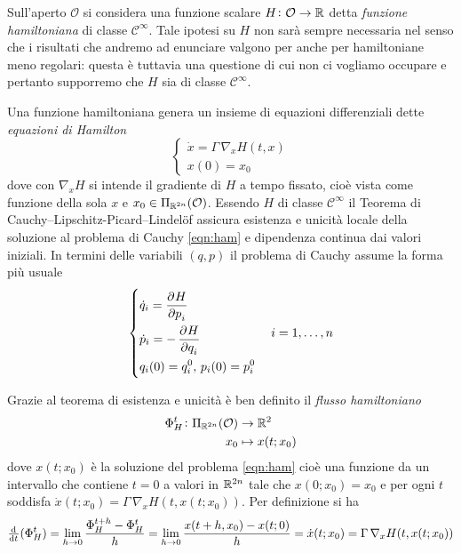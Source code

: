 Sull'aperto $ \mathcal{O} $ si considera una funzione scalare $ H \colon \mathcal{O} \to \mathbb{R} $ detta \emph{funzione hamiltoniana} di classe $ \mathcal{C}^{\infty} $. Tale ipotesi su $ H $ non sarà sempre necessaria nel senso che i risultati che andremo ad enunciare valgono per anche per hamiltoniane meno regolari: questa è tuttavia una questione di cui non ci vogliamo occupare e pertanto supporremo che $ H $ sia di classe $ \mathcal{C}^\infty $.

Una funzione hamiltoniana genera un insieme di equazioni differenziali dette \emph{equazioni di Hamilton}
\begin{equation} \label{eqn:ham}
    \begin{cases}
    \dot{x} = \Gamma \, \nabla_x H(t, x) \\
    x(0) = x_0
    \end{cases}
\end{equation}
dove con $ \nabla_x H $ si intende il gradiente di $ H $ a tempo fissato, cioè vista come funzione della sola $ x $ e $ x_0 \in \Pi_{\mathbb{R}^{2n}}(\mathcal{O}) $. Essendo $ H $ di classe $ \mathcal{C}^\infty $ il Teorema di Cauchy–Lipschitz-Picard–Lindelöf assicura esistenza e unicità locale della soluzione al problema di Cauchy \eqref{eqn:ham} e dipendenza continua dai valori iniziali. In termini delle variabili $ (q, p) $ il problema di Cauchy assume la forma più usuale
\begin{equation}
    \begin{dcases}
        \dot{q}_i = \dpd{H}{p_i} \\
        \dot{p}_i = -\dpd{H}{q_i} \\
        q_i(0) = q_{i}^0, \, p_i(0) = p_i^0 \\
    \end{dcases}
    \quad i = 1, \ldots, n
\end{equation}

Grazie al teorema di esistenza e unicità è ben definito il \emph{flusso hamiltoniano}
\begin{align}
    \Phi_H^t \colon \Pi_{\mathbb{R}^{2n}}(\mathcal{O}) & \to \mathbb{R}^2 \\
    x_0 & \mapsto x(t; x_0)
\end{align}
dove $ x(t; x_0) $ è la soluzione del problema \eqref{eqn:ham} cioè una funzione da un intervallo che contiene $ t=0 $ a valori in $ \mathbb{R}^{2n} $ tale che $ x(0; x_0) = x_0 $ e per ogni $ t $ soddisfa $ \dot{x}(t; x_0) = \Gamma \, \nabla_x H(t, x(t; x_0)) $. Per definizione si ha
\[
    \od{}{t} (\Phi^t_H) = \lim_{h \to 0} \frac{\Phi^{t+h}_H - \Phi^{t}_H}{h} = \lim_{h \to 0} \frac{x(t+h, x_0) - x(t; 0)}{h} = \dot{x}(t; x_0) = \Gamma \, \nabla_x H(t, x(t; x_0))
\]

